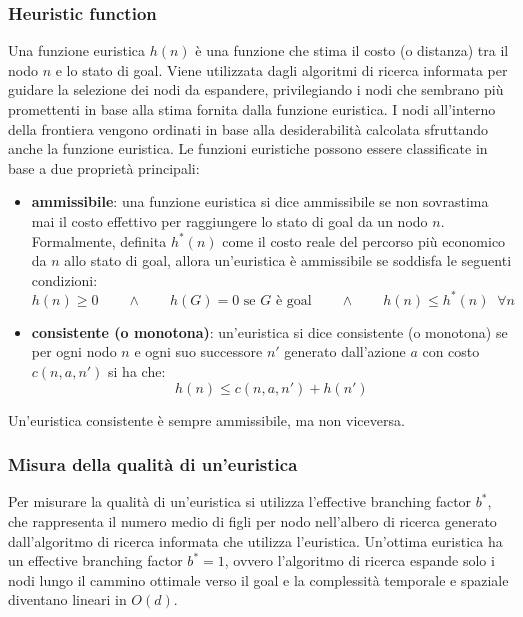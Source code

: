 \subsubsection*{Heuristic function}
Una funzione euristica \(h(n)\) è una funzione che stima il costo (o distanza) tra il nodo \(n\) e lo stato di goal. Viene
utilizzata dagli algoritmi di ricerca informata per guidare la selezione dei nodi da espandere, privilegiando i nodi che
sembrano più promettenti in base alla stima fornita dalla funzione euristica. I nodi all'interno della frontiera vengono
ordinati in base alla desiderabilità calcolata sfruttando anche la funzione euristica.
Le funzioni euristiche possono essere classificate in base a due proprietà principali:
\begin{itemize}
	\item \textbf{ammissibile}: una funzione euristica si dice ammissibile se non sovrastima mai il costo effettivo per
	raggiungere lo stato di goal da un nodo \(n\). Formalmente, definita \(h^*(n)\) come il costo reale del percorso più
	economico da \(n\) allo stato di goal, allora un'euristica è ammissibile se soddisfa le seguenti condizioni:
	\[h(n) \geq 0 \qquad \wedge \qquad h(G) = 0 \text{ se } G \text{ è goal} \qquad \wedge \qquad h(n) \leq h^*(n) \;\; \forall n\]
	\item \textbf{consistente (o monotona)}: un'euristica si dice  consistente (o monotona) se per ogni nodo \(n\) e ogni
	suo successore \(n'\) generato dall'azione \(a\) con costo \(c(n, a, n')\) si ha che:
	\[h(n) \leq c(n, a, n') + h(n')\]
\end{itemize}
Un'euristica consistente è sempre ammissibile, ma non viceversa.

\subsubsection*{Misura della qualità di un'euristica}
Per misurare la qualità di un'euristica si utilizza l'effective branching factor \(b^*\), che rappresenta il numero
medio di figli per nodo nell'albero di ricerca generato dall'algoritmo di ricerca informata che utilizza l'euristica.
Un'ottima euristica ha un effective branching factor \(b^* = 1\), ovvero l'algoritmo di ricerca espande solo i nodi lungo
il cammino ottimale verso il goal e la complessità temporale e spaziale diventano lineari in \(O(d)\).

